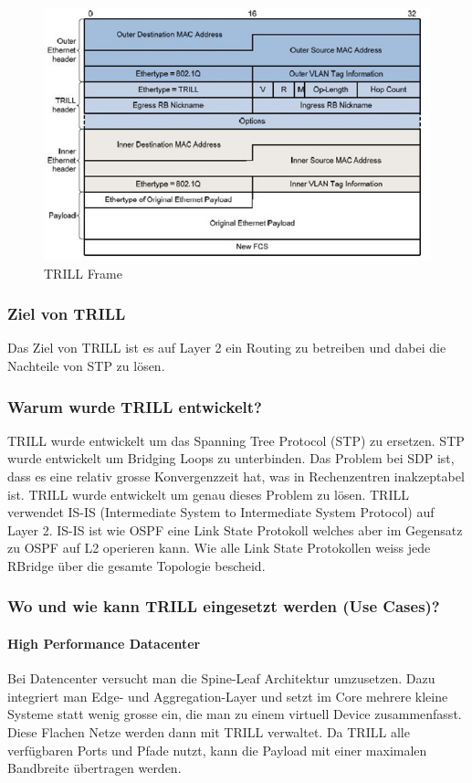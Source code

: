 \begin{figure}[h]
\centering
\includegraphics[width=0.5\linewidth]{images/trill_header}
\caption{TRILL Frame}
\label{fig:trillheader}
\end{figure}

\subsubsection{Ziel von TRILL} %
Das Ziel von TRILL ist es auf Layer 2 ein Routing zu betreiben und dabei die Nachteile von STP zu lösen.

\subsubsection{Warum wurde TRILL entwickelt?} %
TRILL wurde entwickelt um das Spanning Tree Protocol (STP) zu ersetzen. STP wurde entwickelt um Bridging Loops zu unterbinden. Das Problem bei SDP ist, dass es eine relativ grosse Konvergenzzeit hat, was in Rechenzentren inakzeptabel ist. TRILL wurde entwickelt um genau dieses Problem zu lösen. TRILL verwendet IS-IS (Intermediate System to Intermediate System Protocol) auf Layer 2. IS-IS ist wie OSPF eine Link State Protokoll welches aber im Gegensatz zu OSPF auf L2 operieren kann. Wie alle Link State Protokollen weiss jede RBridge über die gesamte Topologie bescheid. 

\subsubsection{Wo und wie kann TRILL eingesetzt werden (Use Cases)?} %


\paragraph{High Performance Datacenter}
Bei Datencenter versucht man die Spine-Leaf Architektur umzusetzen. Dazu integriert man Edge- und Aggregation-Layer und setzt im Core mehrere kleine Systeme statt wenig grosse ein, die man zu einem virtuell Device zusammenfasst. Diese Flachen Netze werden dann mit TRILL verwaltet. Da TRILL alle verfügbaren Ports und Pfade nutzt, kann die Payload mit einer maximalen Bandbreite übertragen werden. 



